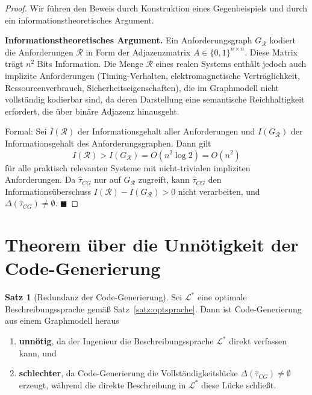 ﻿\documentclass[a4paper,12pt]{report}
\theoremstyle{definition}
\newtheorem{satz}{Satz}[section]
\begin{document}
\begin{proof}
Wir führen den Beweis durch Konstruktion eines Gegenbeispiels und durch ein
informationstheoretisches Argument.

\textbf{Informationstheoretisches Argument.}
Ein Anforderungsgraph $G_\mathcal{R}$ kodiert die Anforderungen $\mathcal{R}$ in Form
der Adjazenzmatrix $A \in \{0,1\}^{n \times n}$. Diese Matrix trägt $n^2$ Bits Information.
Die Menge $\mathcal{R}$ eines realen Systems enthält jedoch auch implizite Anforderungen
(Timing-Verhalten, elektromagnetische Verträglichkeit, Ressourcenverbrauch, Sicherheitseigenschaften),
die im Graphmodell nicht vollständig kodierbar sind, da deren Darstellung eine
semantische Reichhaltigkeit erfordert, die über binäre Adjazenz hinausgeht.

Formal: Sei $I(\mathcal{R})$ der Informationsgehalt aller Anforderungen und
$I(G_\mathcal{R})$ der Informationsgehalt des Anforderungsgraphen. Dann gilt
\[
  I(\mathcal{R}) > I(G_\mathcal{R}) = O(n^2 \log 2) = O(n^2)
\]
für alle praktisch relevanten Systeme mit nicht-trivialen impliziten Anforderungen.
Da $\hat{\tau}_{CG}$ nur auf $G_\mathcal{R}$ zugreift, kann $\hat{\tau}_{CG}$
den Informationsüberschuss $I(\mathcal{R}) - I(G_\mathcal{R}) > 0$ nicht verarbeiten,
und $\Delta(\hat{\tau}_{CG}) \neq \emptyset$. $\blacksquare$
\end{proof}

\section{Theorem über die Unnötigkeit der Code-Generierung}

\begin{satz}[Redundanz der Code-Generierung]
\label{satz:codegen}
Sei $\mathcal{L}^*$ eine optimale Beschreibungssprache gemäß Satz~\ref{satz:optsprache}.
Dann ist Code-Generierung aus einem Graphmodell heraus
\begin{enumerate}
  \item \textbf{unnötig}, da der Ingenieur die Beschreibungssprache $\mathcal{L}^*$ direkt
        verfassen kann, und
  \item \textbf{schlechter}, da Code-Generierung die Vollständigkeitslücke
        $\Delta(\hat{\tau}_{CG}) \neq \emptyset$ erzeugt, während die direkte Beschreibung
        in $\mathcal{L}^*$ diese Lücke schließt.
\end{enumerate}
\end{satz}
\end{document}
